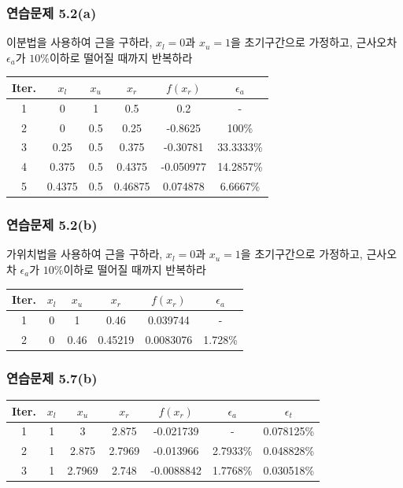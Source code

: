 \subsubsection{연습문제 5.2(a)}
이분법을 사용하여 근을 구하라, $x_l =0$과 $x_{u}=1$을 초기구간으로 가정하고, 근사오차 $\epsilon_{a}$가 $10\%$이하로 떨어질 때까지 반복하라
\begin{table}[!hbpt]
\centering
\begin{tabular}{c|c|c|c|c|c}
\hline\hline
Iter.&$x_{l}$&$x_{u}$&$x_{r}$&$f(x_{r})$&$\epsilon_{a}$\\
\hline
1&0&1&0.5&0.2&-\\
2&0&0.5&0.25&-0.8625&100\%\\
3&0.25&0.5&0.375&-0.30781&33.3333\%\\
4&0.375&0.5&0.4375&-0.050977&14.2857\%\\
5&0.4375&0.5&0.46875&0.074878&6.6667\%\\
\hline\hline
\end{tabular}
\end{table}

\clearpage
\subsubsection{연습문제 5.2(b)}
가위치법을 사용하여 근을 구하라, $x_l =0$과 $x_{u}=1$을 초기구간으로 가정하고, 근사오차 $\epsilon_{a}$가 $10\%$이하로 떨어질 때까지 반복하라
\begin{table}[!hbpt]
\centering
\begin{tabular}{c|c|c|c|c|c}
\hline\hline
Iter.&$x_{l}$&$x_{u}$&$x_{r}$&$f(x_{r})$&$\epsilon_{a}$\\
\hline
1&0&1&0.46&0.039744&-\\
2&0&0.46&0.45219&0.0083076&1.728\%\\
\hline\hline
\end{tabular}
\end{table}

\subsubsection{연습문제 5.7(b)}

\begin{table}[!hbpt]
\centering
\begin{tabular}{c|c|c|c|c|c|c}
\hline\hline
Iter.&$x_{l}$&$x_{u}$&$x_{r}$&$f(x_{r})$&$\epsilon_{a}$&$\epsilon_{t}$\\
\hline
1&1&3&2.875&-0.021739&-&0.078125\%\\
2&1&2.875&2.7969&-0.013966&2.7933\%&0.048828\%\\
3&1&2.7969&2.748&-0.0088842&1.7768\%&0.030518\%\\
\hline\hline
\end{tabular}
\end{table}

